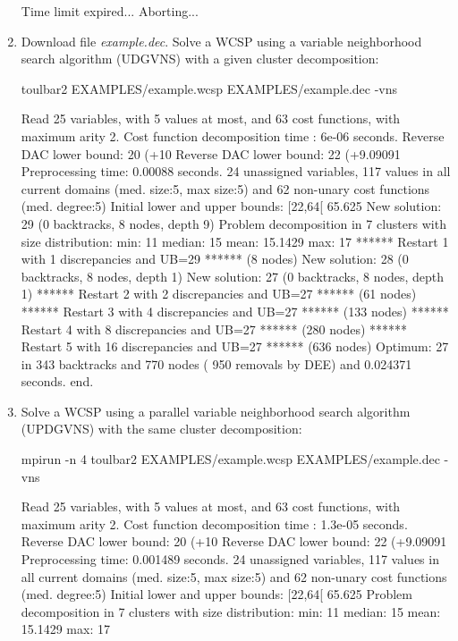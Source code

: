\begin{enumerate}
{\begin{DoxyCode}
Time limit expired... Aborting...
\end{DoxyCode}}
\item Download file {\em example.dec}. Solve a WCSP using a variable neighborhood search algorithm (UDGVNS) with a given cluster decomposition:
\begin{DoxyCode}
	toulbar2 EXAMPLES/example.wcsp EXAMPLES/example.dec -vns
\end{DoxyCode}
{\scriptsize
\begin{DoxyCode}
Read 25 variables, with 5 values at most, and 63 cost functions, with maximum arity 2.
Cost function decomposition time : 6e-06 seconds.
Reverse DAC lower bound: 20 (+10%
Reverse DAC lower bound: 22 (+9.09091%
Preprocessing time: 0.00088 seconds.
24 unassigned variables, 117 values in all current domains (med. size:5, max size:5) and 62 non-unary cost functions (med. degree:5)
Initial lower and upper bounds: [22,64[ 65.625%
New solution: 29 (0 backtracks, 8 nodes, depth 9)
Problem decomposition in 7 clusters with size distribution: min: 11 median: 15 mean: 15.1429 max: 17
****** Restart 1 with 1 discrepancies and UB=29 ****** (8 nodes)
New solution: 28 (0 backtracks, 8 nodes, depth 1)
New solution: 27 (0 backtracks, 8 nodes, depth 1)
****** Restart 2 with 2 discrepancies and UB=27 ****** (61 nodes)
****** Restart 3 with 4 discrepancies and UB=27 ****** (133 nodes)
****** Restart 4 with 8 discrepancies and UB=27 ****** (280 nodes)
****** Restart 5 with 16 discrepancies and UB=27 ****** (636 nodes)
Optimum: 27 in 343 backtracks and 770 nodes ( 950 removals by DEE) and 0.024371 seconds.
end.
\end{DoxyCode}}
\item Solve a WCSP using a parallel variable neighborhood search algorithm (UPDGVNS) with the same cluster decomposition:
\begin{DoxyCode}
	mpirun -n 4 toulbar2 EXAMPLES/example.wcsp EXAMPLES/example.dec -vns
\end{DoxyCode}
{\scriptsize
\begin{DoxyCode}
Read 25 variables, with 5 values at most, and 63 cost functions, with maximum arity 2.
Cost function decomposition time : 1.3e-05 seconds.
Reverse DAC lower bound: 20 (+10%
Reverse DAC lower bound: 22 (+9.09091%
Preprocessing time: 0.001489 seconds.
24 unassigned variables, 117 values in all current domains (med. size:5, max size:5) and 62 non-unary cost functions (med. degree:5)
Initial lower and upper bounds: [22,64[ 65.625%
Problem decomposition in 7 clusters with size distribution: min: 11 median: 15 mean: 15.1429 max: 17

\end{DoxyCode}}
\end{enumerate}
